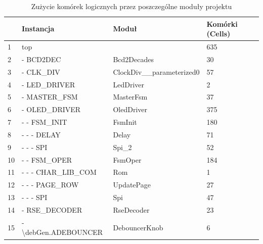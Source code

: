 \documentclass[12pt] {article}
\begin{document}
\begin{table}[H]
\centering
\caption{Zużycie komórek logicznych przez poszczególne moduły projektu}
\begin{tabular}{@{}llll@{}}
\toprule
\rowcolor[HTML]{DAE8FC} 
\textbf{} & \textbf{Instancja}                     & \textbf{Moduł}             & \textbf{Komórki (Cells)} \\ \midrule
1         & top                                    &                            & 635                      \\
2         & - BCD2DEC                              & Bcd2Decades                & 30                       \\
3         & - CLK\_DIV                             & ClockDiv\_\_parameterized0 & 57                       \\
4         & - LED\_DRIVER                          & LedDriver                  & 2                        \\
5         & - MASTER\_FSM                          & MasterFsm                  & 37                       \\
6         & - OLED\_DRIVER                         & OledDriver                 & 375                      \\
7         & - - FSM\_INIT                          & FsmInit                    & 180                      \\
8         & - - - DELAY                            & Delay                      & 71                       \\
9         & - - - SPI                              & Spi\_2                     & 52                       \\
10        & - - FSM\_OPER                          & FsmOper                    & 184                      \\
11        & - - - CHAR\_LIB\_COM                   & Rom                        & 1                        \\
12        & - - - PAGE\_ROW                        & UpdatePage                 & 27                       \\
13        & - - - SPI                              & Spi                        & 47                       \\
14        & - RSE\_DECODER                         & RseDecoder                 & 23                       \\
15        & - \textbackslash{}debGen.ADEBOUNCER    & DebouncerKnob              & 6                        \\

\end{tabular}
\end{table}
\end{document}
